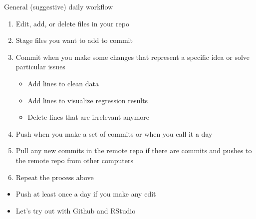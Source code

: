 \documentclass[handout,pdftex,10pt,aspectratio=169]{beamer}
\begin{document}
\begin{frame}{General (suggestive) daily workflow}
    \begin{enumerate}[<+->]
    \item Edit, add, or delete files in your repo
    \item Stage files you want to add to commit
    \item Commit when you make some changes that represent a specific idea or solve particular issues
    \begin{itemize}
      \item Add lines to clean data
      \item Add lines to visualize regression results
      \item Delete lines that are irrelevant anymore
    \end{itemize}
    \item Push when you make a set of commits or when you call it a day
    \item Pull any new commits in the remote repo if there are commits and pushes to the remote repo
    from other computers
    \item Repeat the process above
  \end{enumerate}
  \medskip
  \begin{itemize}[<+->]
    \item Push at least once a day if you make any edit
    \item Let's try out with Github and RStudio
  \end{itemize}
\end{frame}
\end{document}
